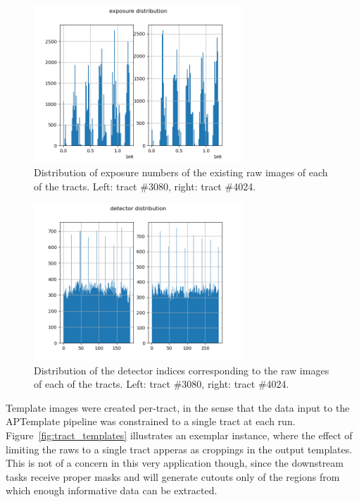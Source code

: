 \documentclass[DM,authoryear,toc]{lsstdoc}
\begin{document}
\begin{figure}[h!]
  \centering
  \includegraphics[width=0.7\textwidth]{exposure_hist.png}
  \caption{Distribution of exposure numbers of the existing raw images of each of the tracts. Left: tract \#3080, right: tract \#4024.}
  \label{fig:exposure_hist}
\end{figure}

\begin{figure}[h!]
  \centering
  \includegraphics[width=0.7\textwidth]{detector_hist.png}
  \caption{Distribution of the detector indices corresponding to the raw images of each of the tracts. Left: tract \#3080, right: tract \#4024.}
  \label{fig:detector_hist}
\end{figure}

\clearpage
Template images were created per-tract, in the sense that the data input to the APTemplate pipeline was constrained to a single tract at each run. Figure~\ref{fig:tract_templates} illustrates an exemplar instance, where the effect of limiting the raws to a single tract apperas as croppings in the output templates. This is not of a concern in this very application though, since the downstream tasks receive proper masks and will generate cutouts only of the regions from which enough informative data can be extracted.
\end{document}
